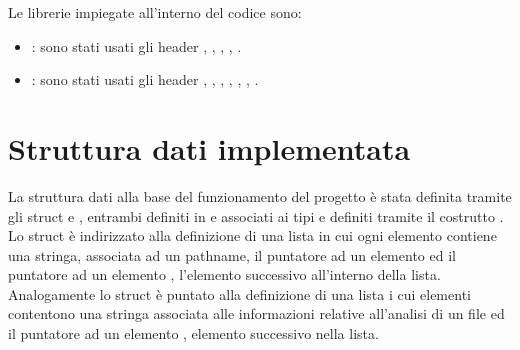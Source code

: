 \documentclass[letterpaper,10pt,italian,openany,oneside]{sphinxmanual}
\begin{document}
Le librerie impiegate all’interno del codice sono:
\begin{itemize}
\item {} 
: sono stati usati gli header , , , , .

\item {} 
: sono stati usati gli header , , , , , , .

\end{itemize}


\section{Struttura dati implementata}
\label{\detokenize{project:struttura-dati-implementata}}
\noindent{}

La struttura dati alla base del funzionamento del progetto è stata definita tramite gli struct  e , entrambi definiti in  e associati
ai tipi  e  definiti tramite il costrutto .
Lo struct  è indirizzato alla definizione di una lista in cui ogni elemento contiene una stringa, associata ad un pathname, il puntatore ad un elemento 
ed il puntatore ad un elemento , l’elemento successivo all’interno della lista. Analogamente lo struct  è puntato alla definizione di una lista i cui elementi
contentono una stringa associata alle informazioni relative all’analisi di un file ed il puntatore ad un elemento , elemento successivo nella lista.
\end{document}
